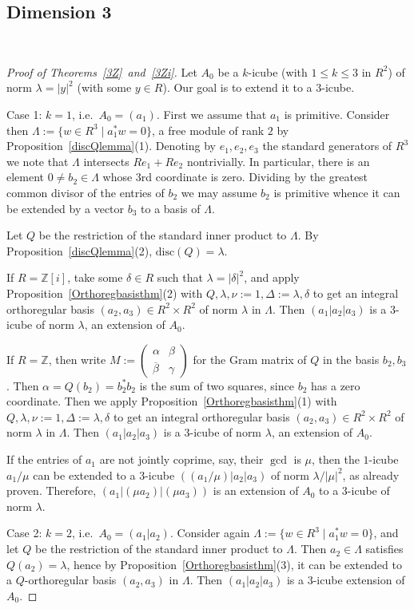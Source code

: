 \documentclass[11pt]{amsart}
\newcommand{\disc}{\mathrm{disc}}
\newcommand{\ZZ}{\mathbb{Z}}
\theoremstyle{definition}
\theoremstyle{remark}
\begin{document}
\subsection{Dimension 3}~
\begin{proof}[Proof of Theorems~\ref{3Z}~and~\ref{3Zi}]
Let $A_0$ be a $k$-icube (with $1\leq k\leq 3$ in $R^2$) of norm $\lambda=|y|^2$ (with some $y\in R$). Our goal is to extend it to a $3$-icube.

Case 1: $k=1$, i.e.~$A_0=(a_1)$. First we assume that 
$a_1$ is primitive. 
Consider then $\Lambda:=\{w\in R^3\mid a_1^*w=0\}$, a free module of rank $2$ by Proposition~\ref{discQlemma}(1). Denoting by $e_1,e_2,e_3$ the standard generators of $R^3$ we note that $\Lambda$ intersects $Re_1+Re_2$ nontrivially. In particular, there is an element $0\neq b_2\in \Lambda$ whose $3$rd coordinate is zero. Dividing by the greatest common divisor of the entries of $b_2$ we may assume $b_2$ is primitive whence it can be extended by a vector $b_3$ to a basis of $\Lambda$.

Let $Q$ be the restriction of the standard inner product to $\Lambda$. By Proposition~\ref{discQlemma}(2), $\disc(Q)=\lambda$.

If $R=\ZZ[i]$, take some $\delta\in R$ such that $\lambda=|\delta|^2$, and apply Proposition~\ref{Orthoregbasisthm}(2) with $Q,\lambda,\nu:=1,\Delta:=\lambda,\delta$ to get an integral orthoregular basis $(a_2,a_3)\in R^2\times R^2$ of norm $\lambda$ in $\Lambda$. Then $(a_1|a_2|a_3)$ is a $3$-icube of norm $\lambda$, an extension of $A_0$.

If $R=\ZZ$, then write $M:=\left(\begin{smallmatrix}
\alpha & \beta \\ \overline{\beta} & \gamma
\end{smallmatrix}\right)$ for the Gram matrix of $Q$ in the basis $b_2,b_3$. Then $\alpha=Q(b_2)=b_2^*b_2$ is the sum of two squares, since $b_2$ has a zero coordinate. Then we apply Proposition~\ref{Orthoregbasisthm}(1) with $Q,\lambda,\nu:=1,\Delta:=\lambda,\delta$ to get an integral orthoregular basis $(a_2,a_3)\in R^2\times R^2$ of norm $\lambda$ in $\Lambda$. Then $(a_1|a_2|a_3)$ is a $3$-icube of norm $\lambda$, an extension of $A_0$.

If the entries of $a_1$ are not jointly coprime, say, their $\gcd$ is $\mu$, then the $1$-icube $a_1/\mu$ can be extended to a $3$-icube $((a_1/\mu)|a_2|a_3)$ of norm $\lambda/|\mu|^2$, as already proven. Therefore, $(a_1|(\mu a_2)|(\mu a_3))$ is an extension of $A_0$ to a $3$-icube of norm $\lambda$.

Case 2: $k=2$, i.e.~$A_0=(a_1|a_2)$. Consider again $\Lambda:=\{w\in R^3\mid a_1^*w=0\}$, and let $Q$ be the restriction of the standard inner product to $\Lambda$. Then $a_2\in \Lambda$ satisfies $Q(a_2)=\lambda$, hence by Proposition~\ref{Orthoregbasisthm}(3), it can be extended to a $Q$-orthoregular basis $(a_2,a_3)$ in $\Lambda$. Then $(a_1|a_2|a_3)$ is a $3$-icube extension of $A_0$.
\end{proof}
\end{document}
